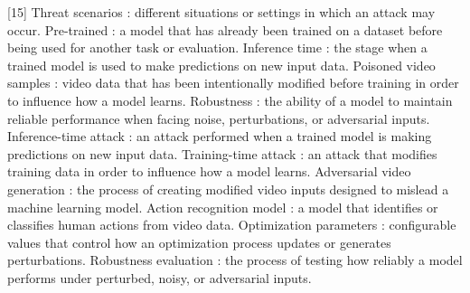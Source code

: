 [15] Threat scenarios : different situations or settings in which an attack may occur. \newline
[16] Pre-trained : a model that has already been trained on a dataset before being used for another task or evaluation. \newline
[17] Inference time : the stage when a trained model is used to make predictions on new input data. \newline
[18] Poisoned video samples : video data that has been intentionally modified before training in order to influence how a model learns. \newline
[19] Robustness : the ability of a model to maintain reliable performance when facing noise, perturbations, or adversarial inputs. \newline
[20] Inference-time attack : an attack performed when a trained model is making predictions on new input data. \newline
[21] Training-time attack : an attack that modifies training data in order to influence how a model learns. \newline
[22] Adversarial video generation : the process of creating modified video inputs designed to mislead a machine learning model. \newline
[23] Action recognition model : a model that identifies or classifies human actions from video data. \newline
[24] Optimization parameters : configurable values that control how an optimization process updates or generates perturbations. \newline
[25] Robustness evaluation : the process of testing how reliably a model performs under perturbed, noisy, or adversarial inputs. \newline